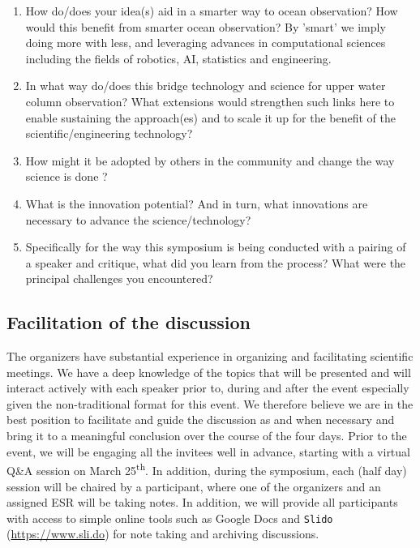 \begin{enumerate}

\item How do/does your idea(s) aid in a smarter way to ocean
  observation? How would this benefit from smarter ocean observation? By
  'smart' we imply doing more with less, and leveraging advances in
  computational sciences including the fields of robotics, AI,
  statistics and engineering.

\item In what way do/does this bridge technology and science for upper
  water column observation? What extensions would strengthen such links
  here to enable sustaining the approach(es) and to scale it up for the
  benefit of the scientific/engineering technology?

\item How might it be adopted by others in the community and change the
  way science is done ?

\item What is the innovation potential? And in turn, what innovations
  are necessary to advance the science/technology?

\item Specifically for the way this symposium is being conducted with a
  pairing of a speaker and critique, what did you learn from the
  process? What were the principal challenges you encountered?

\end{enumerate}

\subsection{Facilitation of the discussion}

The organizers have substantial experience in organizing and
facilitating scientific meetings. We have a deep knowledge of the
topics that will be presented and will interact actively with each
speaker prior to, during and after the event especially given the
non-traditional format for this event. We therefore believe we are in
the best position to facilitate and guide the discussion as and when
necessary and bring it to a meaningful conclusion over the course of
the four days. Prior to the event, we will be engaging all the
invitees well in advance, starting with a virtual Q\&A session on
March 25\textsuperscript{th}. In addition, during the symposium, each
(half day) session will be chaired by a participant, where one of the
organizers and an assigned ESR will be taking notes. In addition, we
will provide all participants with access to simple online tools
such as Google Docs and \texttt{Slido} (\url{https://www.sli.do}) for
note taking and archiving discussions. 

